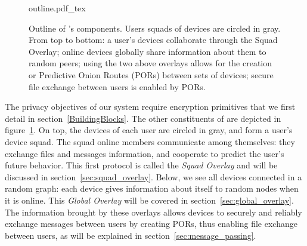 \begin{figure}[t]
\centering
\def\svgwidth{0.8\columnwidth}
%
{outline.pdf_tex}
\caption{\label{fig:outline}Outline of \name's components. Users squads of devices are circled in gray. From top to bottom: a user's devices collaborate through the Squad Overlay; online devices globally share information about them to random peers; using the two above overlays allows for the creation or Predictive Onion Routes (PORs) between sets of devices; secure file exchange between users is enabled by PORs.}
\end{figure}

The privacy objectives of our system require encryption primitives that we first detail in section~\ref{BuildingBlocks}. The other constituents of \name are depicted in figure~\ref{fig:outline}.
On top, the devices of each user are circled in gray, and form a user's device squad. The squad online members communicate among themselves: they exchange files and messages information, and cooperate to predict the user's future behavior. 
This first protocol is called the \emph{Squad Overlay} and will be discussed in section~\ref{sec:squad_overlay}.
Below, we see all devices connected in a random graph: each device gives information about itself to random nodes when it is online. 
This \emph{Global Overlay} will be covered in section~\ref{sec:global_overlay}.
The information brought by these overlays allows devices to securely and reliably exchange messages between users by creating PORs, thus enabling file exchange between users, as will be explained in section~\ref{sec:message_passing}.





%
